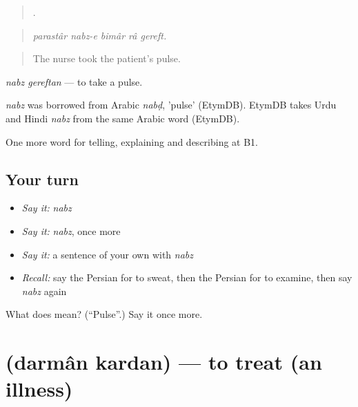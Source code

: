 \begin{quote}
    .
\end{quote}

\begin{quote}
\emph{parastâr nabz-e bimâr râ gereft.}
\end{quote}

\begin{quote}
The nurse took the patient's pulse.
\end{quote}

\emph{nabz gereftan} — to take a pulse.

\begin{cousinweb}
\emph{nabz} was borrowed from Arabic \emph{nabḍ}, 'pulse' (EtymDB). EtymDB takes Urdu and Hindi \emph{nabz} from the same Arabic word (EtymDB).
\end{cousinweb}

\begin{grammarlens}[title={What you've built}]
One more word for telling, explaining and describing at B1.
\end{grammarlens}

\subsection*{Your turn}
\begin{itemize}
\raggedright
  \item \emph{Say it:} \emph{nabz}
  \item \emph{Say it:} \emph{nabz}, once more
  \item \emph{Say it:} a sentence of your own with \emph{nabz}
  \item \emph{Recall:} say the Persian for to sweat, then the Persian for to examine, then say \emph{nabz} again
\end{itemize}

\begin{tcolorbox}[breakable,colback=teal!4,colframe=teal!35!black,title={Before you move on}]
What does  mean? (\textquotedblleft{}Pulse\textquotedblright{}.) Say it once more.
\end{tcolorbox}
\section[\texorpdfstring{\fa{درمان} \fa{کردن} (darmân kardan)}{درمان کردن (darmân kardan)}]{  (darmân kardan) — to treat (an illness)}

\label{lesson:FA-C493-darman-kardan}



